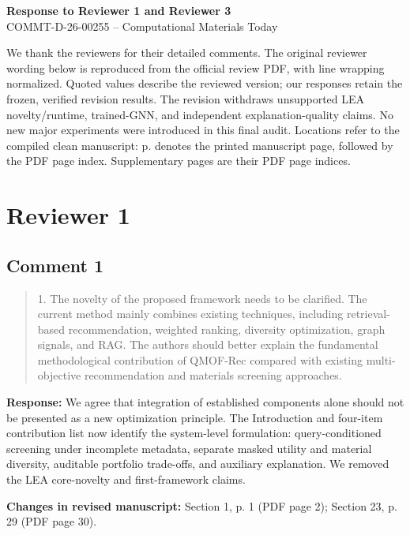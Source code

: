 \documentclass[11pt,a4paper]{article}
\begin{document}
\begin{center}{\Large\bfseries Response to Reviewer 1 and Reviewer 3}\\[4pt]COMMT-D-26-00255 -- Computational Materials Today\end{center}
We thank the reviewers for their detailed comments. The original reviewer wording below is reproduced from the official review PDF, with line wrapping normalized. Quoted values describe the reviewed version; our responses retain the frozen, verified revision results. The revision withdraws unsupported LEA novelty/runtime, trained-GNN, and independent explanation-quality claims. No new major experiments were introduced in this final audit. Locations refer to the compiled clean manuscript: p. denotes the printed manuscript page, followed by the PDF page index. Supplementary pages are their PDF page indices.

\section*{Reviewer 1}
\subsection*{Comment 1}
\begin{quote}\small 1. The novelty of the proposed framework needs to be clarified. The current method mainly combines existing techniques, including retrieval-based recommendation, weighted ranking, diversity optimization, graph signals, and RAG. The authors should better explain the fundamental methodological contribution of QMOF-Rec compared with existing multi-objective recommendation and materials screening approaches.\end{quote}
\textbf{Response:} We agree that integration of established components alone should not be presented as a new optimization principle. The Introduction and four-item contribution list now identify the system-level formulation: query-conditioned screening under incomplete metadata, separate masked utility and material diversity, auditable portfolio trade-offs, and auxiliary explanation. We removed the LEA core-novelty and first-framework claims.

\textbf{Changes in revised manuscript:} Section 1, p. 1 (PDF page 2); Section 23, p. 29 (PDF page 30).
\end{document}

